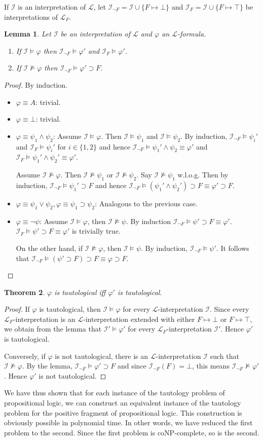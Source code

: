 \documentclass[a4paper,10pt]{article}
\newcommand{\imp}{\supset}
\newcommand{\I}{\mathcal{I}}
\newcommand{\Ib}{\I_{¬ F}}
\newcommand{\It}{\I_{F}}
\renewcommand{\L}{\mathcal{L}}
\newcommand{\Lf}{\L_F}
\newtheorem{theorem}{Theorem}
\newtheorem{lemma}[theorem]{Lemma}
\theoremstyle{definition}
\begin{document}
If $\I$ is an interpretation of $\L$, let $\Ib = \I ∪ \{ F \mapsto \bot\}$ and $\It = \I ∪ \{F \mapsto \top\}$ be interpretations of $\Lf$.
\begin{lemma}
 Let $\I$ be an interpretation of $\L$ and $φ$ an $\L$-formula.
 \begin{enumerate}
  \item If $\I \vDash φ$ then $\Ib \vDash φ'$ and $\It \vDash φ'$.
  \item If $\I \not\vDash φ$ then $\Ib \vDash φ' \imp F$.
 \end{enumerate}
\end{lemma}
\begin{proof}
 By induction.
 \begin{itemize}
  \item $φ \equiv A$: trivial.
  \item $φ \equiv \bot$: trivial.
  \item $φ \equiv ψ_1 ∧ ψ_2$: Assume $\I \vDash φ$. Then $\I \vDash ψ_1$ and $\I \vDash ψ_2$. By induction, $\Ib \vDash ψ_i'$ and $\It \vDash ψ_i'$ for $i \in \{1,2\}$ and hence $\Ib \vDash ψ_1' ∧ ψ_2 \equiv φ' $ and $\It \vDash ψ_1' ∧ ψ_2' \equiv φ'$.
  
  Assume $\I \not \vDash φ$. Then $\I \not \vDash ψ_1$ or $\I \not \vDash ψ_2$. Say $\I \not \vDash ψ_1$ w.l.o.g. Then by induction, $\Ib \vDash ψ_1' \imp F$ and hence $\Ib \vDash (ψ_1' ∧ ψ_2') \imp F \equiv φ' \imp F$.
  \item $φ \equiv ψ_1 ∨ ψ_2, φ \equiv ψ_1 \imp ψ_2$: Analogous to the previous case.
  \item $φ \equiv ¬ ψ$: Assume $\I \vDash φ$, then $\I \not \vDash ψ$. By induction $\Ib \vDash ψ' \imp F \equiv φ'$. $\It \vDash ψ' \imp F \equiv φ'$ is trivially true.
  
  On the other hand, if $\I \not \vDash φ$, then $\I \vDash ψ$. By induction, $\Ib \vDash ψ'$. It follows that $\Ib \vDash (ψ' \imp F) \imp F \equiv φ \imp F$.
 \end{itemize}
\end{proof}
\begin{theorem}
 $φ$ is tautological iff $φ'$ is tautological.
\end{theorem}
\begin{proof}
If $φ$ is tautological, then $\I \vDash φ$ for every $\L$-interpretation $\I$. Since every $\Lf$-interpretation is an $\L$-interpretation extended with either $ F \mapsto \bot$ or $ F \mapsto \top$, we obtain from the lemma that $\I' \vDash φ'$ for every $\Lf$-interpretation $\I'$. Hence $φ'$ is tautological.

Conversely, if $φ$ is not tautological, there is an $\L$-interpretation $\I$ such that $\I \not \vDash φ$. By the lemma, $\Ib \vDash φ' \imp F$ and since $\Ib(F) = \bot$, this means $\Ib \not \vDash φ'$. Hence $φ'$ is not tautological.
 \end{proof}
 
 We have thus shown that for each instance of the tautology problem of propositional logic, we can construct an equivalent instance of the tautology problem for the positive fragment of propositional logic. This construction is obviously possible in polynomial time. In other words, we have reduced the first problem to the second. Since the first problem is coNP-complete, so is the second.
\end{document}
